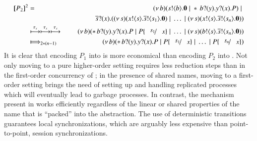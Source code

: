 \begin{eqnarray*}
\pmap{P_2}{2} & = & 	\newsp{b}{\bout{s}{b} \inact \Par \repl \binp{b}{y} \binp{y}{x} P} \Par \\
& & \qquad \qquad \binp{\dual{s}}{x} (\newsp{s}{\bout{x}{s} \bout{\dual{s}}{s_1} \inact} \Par \dots \Par \newsp{s}{\bout{x}{s} \bout{\dual{s}}{s_n}\inact})
	\\
	& \hby{\stau}  \hby{\stau} \hby{\stau} & 
	\newsp{b}{\repl \binp{b}{y} \binp{y}{x} P \Par P\subst{s_1}{x} \Par \dots \Par \newsp{s}{\bout{b}{s} \bout{\dual{s}}{s_n} \inact}}
	\\
	& \Hby{}_{2*(n - 1)} & 
	\newsp{b}{\repl \binp{b}{y} \binp{y}{x} P \Par P\subst{s_1}{x} \Par \dots \Par P\subst{s_n}{x}}
\end{eqnarray*}
\noi 
It is clear that encoding $P_1$ into \HO is more economical than 
encoding $P_2$ into \sessp. Not only moving to a pure higher-order setting requires less reduction steps than in the first-order concurrency of \sessp; in the presence of shared names, moving to a first-order setting brings the need of setting up and handling replicated processes which will eventually lead to garbage processes. In contrast, the mechanism present in \HO works efficiently regardless of the linear or shared properties of the name that is ``packed'' into the abstraction. 
The use of deterministic transitions guarantees local synchronizations, which are arguably less expensive than point-to-point, session synchronizations.

